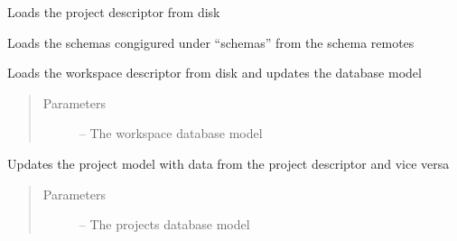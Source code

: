 \documentclass[letterpaper,10pt,english]{sphinxmanual}
\begin{document}

\begin{fulllineitems}
\label{_source/son_editor.util:son_editor.util.descriptorutil.load_project_descriptor}
Loads the project descriptor from disk

\end{fulllineitems}


\begin{fulllineitems}
\label{_source/son_editor.util:son_editor.util.descriptorutil.load_schemas}
Loads the schemas congigured under ``schemas'' from the schema remotes

\end{fulllineitems}


\begin{fulllineitems}
\label{_source/son_editor.util:son_editor.util.descriptorutil.load_workspace_descriptor}
Loads the workspace descriptor from disk and updates the database model
\begin{quote}\begin{description}
\item[{Parameters}] \leavevmode
{} -- The workspace database model

\end{description}\end{quote}

\end{fulllineitems}


\begin{fulllineitems}
\label{_source/son_editor.util:son_editor.util.descriptorutil.sync_project_descriptor}
Updates the project model with data from the project descriptor and vice versa
\begin{quote}\begin{description}
\item[{Parameters}] \leavevmode
{} -- The projects database model

\end{description}\end{quote}

\end{fulllineitems}
\end{document}

